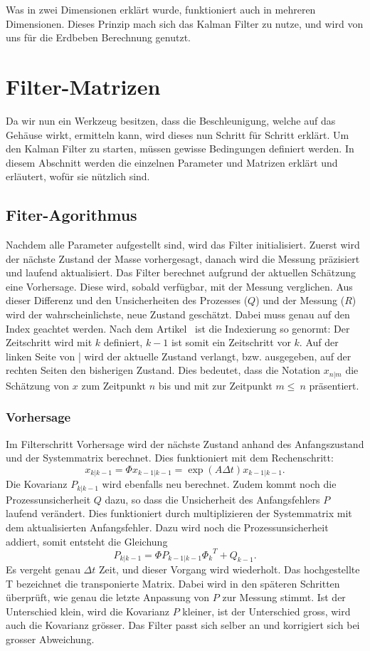 Was in zwei Dimensionen erklärt wurde, funktioniert auch in mehreren Dimensionen. 
Dieses Prinzip mach sich das Kalman Filter zu nutze, und wird von uns für die Erdbeben Berechnung genutzt. 

\section{Filter-Matrizen}
Da wir nun ein Werkzeug besitzen, dass die Beschleunigung, welche auf das Gehäuse wirkt, ermitteln kann, wird dieses nun Schritt für Schritt erklärt. 
Um den Kalman Filter zu starten, müssen gewisse Bedingungen definiert werden. 
In diesem Abschnitt werden die einzelnen Parameter und Matrizen erklärt und erläutert, wofür sie nützlich sind. 

\subsection{Fiter-Agorithmus}
Nachdem alle Parameter aufgestellt sind, wird das Filter initialisiert.
Zuerst wird der nächste Zustand der Masse vorhergesagt, danach wird die Messung präzisiert und laufend aktualisiert. 
Das Filter berechnet aufgrund der aktuellen Schätzung eine Vorhersage. 
Diese wird, sobald verfügbar, mit der Messung verglichen. 
Aus dieser Differenz und den Unsicherheiten des Prozesses ($Q$) und der Messung ($R$) wird der wahrscheinlichste, neue Zustand geschätzt.
Dabei muss genau auf den Index geachtet werden. Nach dem Artikel~\cite{erdbeben:wikipedia} ist die Indexierung so genormt:
Der Zeitschritt wird mit $k$ definiert, $k-1$ ist somit ein Zeitschritt vor $k$.
Auf der linken Seite von | wird der aktuelle Zustand verlangt, bzw. ausgegeben, auf der rechten Seiten den bisherigen Zustand.
Dies bedeutet, dass die Notation $x_{n|m}$ die Schätzung von $x$ zum Zeitpunkt $n$ bis und mit zur Zeitpunkt $m \leq \ n$ präsentiert. 

\subsubsection*{Vorhersage}
Im Filterschritt Vorhersage wird der nächste Zustand anhand des Anfangszustand und der Systemmatrix berechnet. 
Dies funktioniert mit dem Rechenschritt:
\[
{x_{k|k-1}}=\Phi{x_{k-1|k-1}}= \exp(A\Delta t){x_{k-1|k-1}}.
\] 
Die Kovarianz $P_{k|k-1}$ wird ebenfalls neu berechnet. Zudem kommt noch die Prozessunsicherheit $Q$ dazu, so dass die Unsicherheit des Anfangsfehlers $P$ laufend verändert. 
Dies funktioniert durch multiplizieren der Systemmatrix mit dem aktualisierten Anfangsfehler. 
Dazu wird noch die Prozessunsicherheit addiert, somit entsteht die Gleichung
\[
{P_{k|k-1}}=\Phi {P_{k-1|k-1}} {\Phi _{k}}^T + {Q_{k-1}}.
\] 
Es vergeht genau $\Delta t$ Zeit, und dieser Vorgang wird wiederholt. 
Das hochgestellte T bezeichnet die transponierte Matrix.
Dabei wird in den späteren Schritten überprüft, wie genau die letzte Anpassung von $P$ zur Messung stimmt. 
Ist der Unterschied klein, wird die Kovarianz $P$ kleiner, ist der Unterschied gross, wird auch die Kovarianz grösser. 
Das Filter passt sich selber an und korrigiert sich bei grosser Abweichung.

